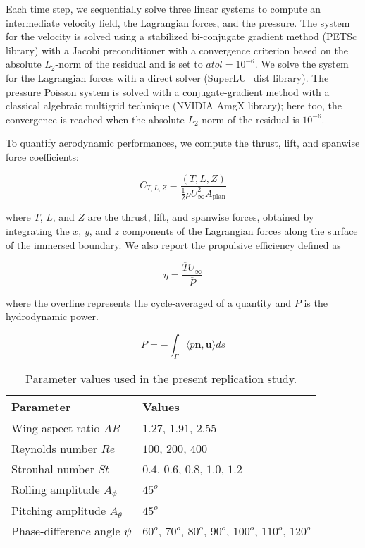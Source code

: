 Each time step, we sequentially solve three linear systems to compute an intermediate velocity field, the Lagrangian forces, and the pressure.
The system for the velocity is solved using a stabilized bi-conjugate gradient method (PETSc library) with a Jacobi preconditioner with a convergence criterion based on the absolute $L_2$-norm of the residual and is set to $atol = 10^{-6}$.
We solve the system for the Lagrangian forces with a direct solver (SuperLU\_dist library).
The pressure Poisson system is solved with a conjugate-gradient method with a classical algebraic multigrid technique (NVIDIA AmgX library); here too, the convergence is reached when the absolute $L_2$-norm of the residual is $10^{-6}$.

To quantify aerodynamic performances, we compute the thrust, lift, and spanwise force coefficients:

\begin{equation}
  C_{T, L, Z} = \frac{\left( T, L, Z \right)}{\frac{1}{2} \rho U_\infty^2 A_\text{plan}}
\end{equation}

where $T$, $L$, and $Z$ are the thrust, lift, and spanwise forces, obtained by integrating the $x$, $y$, and $z$ components of the Lagrangian forces along the surface of the immersed boundary.
We also report the propulsive efficiency defined as

\begin{equation}
  \eta = \frac{\overline{T} U_\infty}{\overline{P}}
\end{equation}

where the overline represents the cycle-averaged of a quantity and $P$ is the hydrodynamic power.

\begin{equation}
  P = - \int_\Gamma \langle p \mathbf{n}, \mathbf{u} \rangle ds
\end{equation}

\begin{table}
  \centering
  \begin{tabular}{ll}
    \hline\hline
    Parameter & Values \\
    \hline
    Wing aspect ratio $AR$ & $1.27$, $1.91$, $2.55$ \\
    Reynolds number $Re$ & $100$, $200$, $400$ \\
    Strouhal number $St$ & $0.4$, $0.6$, $0.8$, $1.0$, $1.2$ \\
    Rolling amplitude $A_\phi$ & $45^o$ \\
    Pitching amplitude $A_\theta$ & $45^o$ \\
    Phase-difference angle $\psi$ & $60^o$, $70^o$, $80^o$, $90^o$, $100^o$, $110^o$, $120^o$ \\
    \hline\hline
  \end{tabular}
  \caption{Parameter values used in the present replication study.}
  \label{tab:parameters}
\end{table}

